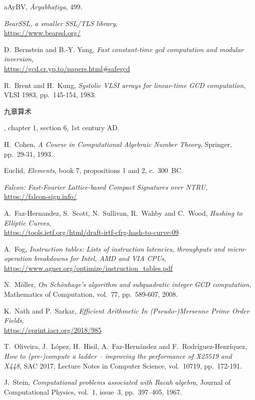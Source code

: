 \documentclass{llncs}
\begin{document}
\begin{thebibliography}{20}

{\dn aAy\0BV},
\emph{\={A}ryabha\d{t}\={\i}ya}, 499.

\emph{BearSSL, a smaller SSL/TLS library},\\
\url{https://www.bearssl.org/}

D.~Bernstein and B.-Y. Yang,
\emph{Fast constant-time gcd computation and modular inversion},\\
\url{https://gcd.cr.yp.to/papers.html#safegcd}

R.~Brent and H.~Kung,
\emph{Systolic VLSI arrays for linear-time GCD computation},
VLSI 1983, pp.~145-154, 1983.

\begin{CJK*}{UTF8}{gbsn}九章算术\end{CJK*}, chapter 1, section 6,
1st century AD.

H.~Cohen,
\emph{A Course in Computational Algebraic Number Theory},
Springer, pp.~29-31, 1993.

Euclid,
\emph{Elements}, book 7, propositions 1 and 2, c.~300~BC.

\emph{Falcon: Fast-Fourier Lattice-based Compact Signatures over NTRU},\\
\url{https://falcon-sign.info/}

A.~Faz-Hernandez, S.~Scott, N.~Sullivan, R.~Wahby and C.~Wood,
\emph{Hashing to Elliptic Curves},\\
\url{https://tools.ietf.org/html/draft-irtf-cfrg-hash-to-curve-09}

A.~Fog,
\emph{Instruction tables: Lists of instruction latencies, throughputs
and micro-operation breakdowns for Intel, AMD and VIA CPUs},\\
\url{https://www.agner.org/optimize/instruction_tables.pdf}

N.~Möller,
\emph{On Schönhage's algorithm and subquadratic integer GCD computation},
Mathematics of Computation, vol.~77, pp.~589-607, 2008.

K.~Nath and P.~Sarkar,
\emph{Efficient Arithmetic In (Pseudo-)Mersenne Prime Order Fields},\\
\url{https://eprint.iacr.org/2018/985}

T.~Oliveira, J.~López, H.~Hisil, A.~Faz-Hernández and F.~Rodríguez-Henríquez,\\
\emph{How to \hbox{(pre-)compute} a ladder -- improving the performance of
X25519 and X448}, SAC 2017, Lecture Notes in Computer Science,
vol.~10719, pp.~172-191.

J.~Stein,
\emph{Computational problems associated with Racah algebra},
Journal of Computational Physics, vol.~1, issue~3, pp.~397–405, 1967.

\end{thebibliography}
\end{document}
